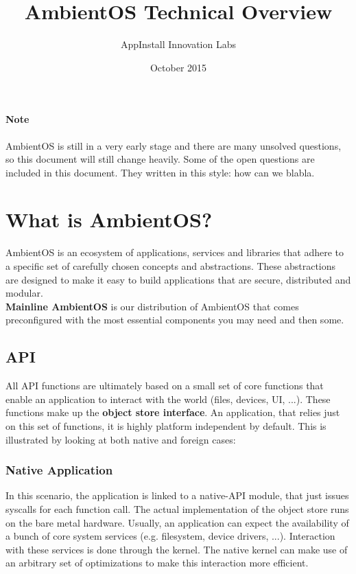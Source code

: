 \documentclass[a4paper]{article}
\title{AmbientOS Technical Overview}
\author{AppInstall Innovation Labs}
\date{October 2015}
\begin{document}
\maketitle

\paragraph{Note} AmbientOS is still in a very early stage and there are many unsolved questions, so this document will still change heavily. Some of the open questions are included in this document. They written in this style: {\q how can we blabla}.

\section{What is AmbientOS?}
AmbientOS is an ecosystem of applications, services and libraries that adhere to a specific set of carefully chosen concepts and abstractions. These abstractions are designed to make it easy to build applications that are secure, distributed and modular. \\
{\bf Mainline AmbientOS} is our distribution of AmbientOS that comes preconfigured with the most essential components you may need and then some.

\subsection{API}
All API functions are ultimately based on a small set of core functions that enable an application to interact with the world (files, devices, UI, ...). These functions make up the {\bf object store interface}. An application, that relies just on this set of functions, it is highly platform independent by default. This is illustrated by looking at both native and foreign cases:

\subsubsection{Native Application}
In this scenario, the application is linked to a native-API module, that just issues syscalls for each function call. The actual implementation of the object store runs on the bare metal hardware. Usually, an application can expect the availability of a bunch of core system services (e.g. filesystem, device drivers, ...). Interaction with these services is done through the kernel. The native kernel can make use of an arbitrary set of optimizations to make this interaction more efficient.
\end{document}
